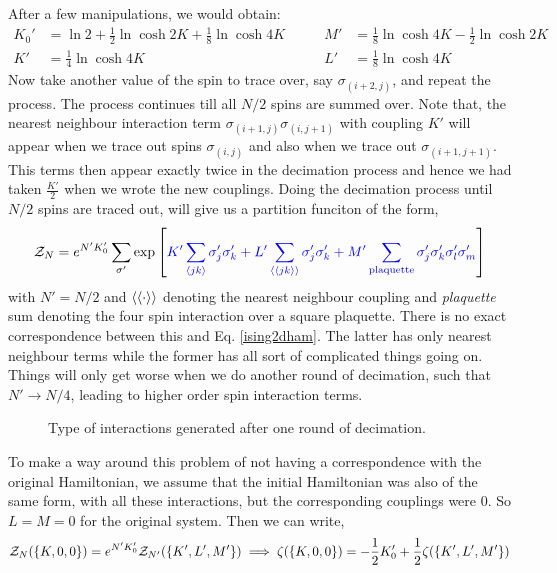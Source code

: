 After a few manipulations, we would obtain: 
\begin{equation}\label{recrel2d}
\begin{alignedat}{2}
K_0' &= \ln 2 + \frac{1}{2}\ln \cosh 2K + \frac{1}{8}\ln \cosh 4K 
\qquad & M' &= \frac{1}{8}\ln \cosh 4K - \frac{1}{2}\ln \cosh 2K \\
K' &= \frac{1}{4}\ln \cosh 4K 
\qquad & L' &= \frac{1}{8}\ln \cosh 4K
\end{alignedat}
\end{equation}
Now take another value of the spin to trace over, say $\sigma_{(i+2,j)}$,  and repeat the process. The process continues till all $N/2$ spins are summed over. Note that, the nearest neighbour interaction term $\sigma_{(i+1,j)}\sigma_{(i,j+1)}$ with coupling $K'$ will appear when we trace out spins $\sigma_{(i,j)}$ and also when we trace out $\sigma_{(i+1,j+1)}$. This terms then appear exactly twice in the decimation process and hence we had taken $\frac{K'}{2}$ when we wrote the new couplings. Doing the decimation process until $N/2$ spins are traced out, will give us a partition funciton of the form,
$$\SZ_N = e^{N' K_0'} \sum\limits_{\sigma'} \exp\qty[\mathcolor{blue}{K'\sum\limits_{\avg{jk}}\sigma'_j \sigma'_k+L'\sum\limits_{\avg{\avg{jk}}}\sigma'_j \sigma'_k+M'\sum\limits_{\text{plaquette}}\sigma'_j \sigma'_k\sigma'_l\sigma'_m}]$$
with $N'=N/2$ and $\left\langle \left\langle \cdot \right\rangle \right\rangle$ denoting the nearest neighbour coupling and \textit{plaquette} sum denoting the four spin interaction over a square plaquette. There is no exact correspondence between this and Eq. \eqref{ising2dham}. The latter has only nearest neighbour terms while the former has all sort of complicated things going on. Things will only get worse when we do another round of decimation, such that $N'\to N/4$, leading to higher order spin interaction terms. 
\begin{figure}[H]
    \centering
    
    \caption{Type of interactions generated after one round of decimation.}
\end{figure}
\noindent
To make a way around this problem of not having a correspondence with the original Hamiltonian, we assume that the initial Hamiltonian was also of the same form, with all these interactions, but the corresponding couplings were $0$. So $L=M=0$ for the original system. Then we can write,
\begin{align*}
    \mathcal Z_{N}(\qty{K,0,0}) = e^{N' K_0'}\mathcal Z_{N'}(\qty{K',L',M'}) \implies \zeta(\qty{K,0,0}) = -\frac{1}{2}K_0' + \frac{1}{2}\zeta(\qty{K',L',M'})
\end{align*}
